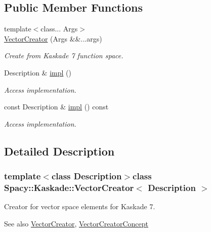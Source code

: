 \subsection*{Public Member Functions}
\begin{DoxyCompactItemize}
\item 
{\footnotesize template$<$class... Args$>$ }\\\hyperlink{classSpacy_1_1Kaskade_1_1VectorCreator_a3e70852b11f264512c32a72a69477001_a3e70852b11f264512c32a72a69477001}{Vector\+Creator} (Args \&\&...args)
\begin{DoxyCompactList}\small\item\em Create from Kaskade 7 function space. \end{DoxyCompactList}\item 
\hypertarget{classSpacy_1_1Mixin_1_1Impl_a5e61399bae41338a87e701b24b13f52a}{}Description \& \hyperlink{classSpacy_1_1Mixin_1_1Impl_a5e61399bae41338a87e701b24b13f52a}{impl} ()\label{classSpacy_1_1Mixin_1_1Impl_a5e61399bae41338a87e701b24b13f52a}

\begin{DoxyCompactList}\small\item\em Access implementation. \end{DoxyCompactList}\item 
\hypertarget{classSpacy_1_1Mixin_1_1Impl_a5107a82d550ed5f6564ffe9155c48fae}{}const Description \& \hyperlink{classSpacy_1_1Mixin_1_1Impl_a5107a82d550ed5f6564ffe9155c48fae}{impl} () const\label{classSpacy_1_1Mixin_1_1Impl_a5107a82d550ed5f6564ffe9155c48fae}

\begin{DoxyCompactList}\small\item\em Access implementation. \end{DoxyCompactList}\end{DoxyCompactItemize}


\subsection{Detailed Description}
\subsubsection*{template$<$class Description$>$class Spacy\+::\+Kaskade\+::\+Vector\+Creator$<$ Description $>$}

Creator for vector space elements for Kaskade 7. 

\begin{DoxySeeAlso}{See also}
\hyperlink{group__SpacyGroup_ga1f5316487c031a478247206764bb2efb_VectorCreatorAnchor}{Vector\+Creator}, \hyperlink{group__ConceptGroup_ga3064301642b7c66b1b08f88a12a04645_VectorCreatorConceptAnchor}{Vector\+Creator\+Concept} 
\end{DoxySeeAlso}



